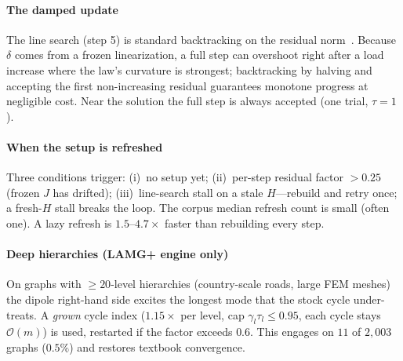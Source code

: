 \documentclass{siamart220329}
\newcommand{\Om}{\mathcal{O}(m)}
\begin{document}
\paragraph{The damped update} The line search (step 5) is standard backtracking on the residual
norm~\cite[Ch.~3]{nocedal-wright}. Because $\delta$ comes from a frozen linearization, a full step
can overshoot right after a load increase where the law's curvature is strongest; backtracking by
halving and accepting the first non-increasing residual guarantees monotone progress at negligible
cost. Near the solution the full step is always accepted (one trial, $\tau=1$).

\paragraph{When the setup is refreshed} Three conditions trigger: (i)~no setup yet; (ii)~per-step residual factor $>0.25$ (frozen $J$ has drifted); (iii)~line-search stall on a stale $H$---rebuild and retry once; a fresh-$H$ stall breaks the loop. The corpus median refresh count is small (often one). A lazy refresh is $1.5$--$4.7\times$ faster than rebuilding every step.

\paragraph{Deep hierarchies (LAMG+ engine only)} On graphs with ${\ge}20$-level hierarchies (country-scale roads, large FEM meshes) the dipole right-hand side excites the longest mode that the stock cycle under-treats. A \emph{grown} cycle index ($1.15\times$ per level, cap $\gamma_l\tau_l\le0.95$, each cycle stays $\Om$) is used, restarted if the factor exceeds $0.6$. This engages on $11$ of $2{,}003$ graphs ($0.5\%$) and restores textbook convergence.
\end{document}
